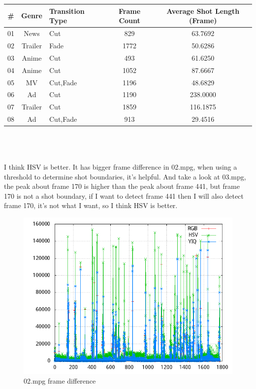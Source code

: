 \documentclass[11pt]{article}
\begin{document}
\section{}

\begin{tabular}{c|c|l|c||c}
	\# & Genre & Transition Type & Frame Count & Average Shot Length (Frame)\\
\hline
\hline
	01 & News & Cut & 829 & 63.7692\\
\hline
	02 & Trailer & Fade & 1772 & 50.6286\\
\hline
	03 & Anime & Cut & 493 & 61.6250\\
\hline
	04 & Anime & Cut & 1052 & 87.6667\\
\hline
	05 & MV & Cut,Fade & 1196 & 48.6829\\
\hline
	06 & Ad & Cut & 1190 & 238.0000\\
\hline
	07 & Trailer & Cut & 1859 & 116.1875\\
\hline
	08 & Ad & Cut,Fade & 913 & 29.4516\\
\end{tabular}
\\
\\
\\
I think HSV is better. It has bigger frame difference in 02.mpg, when using a threshold to determine shot boundaries, it's helpful. And take a look at 03.mpg, the peak about frame 170 is higher than the peak about frame 441, but frame 170 is not a shot boundary, if I want to detect frame 441 then I will also detect frame 170, it's not what I want, so I think HSV is better.
\begin{figure}[ht]
\centering
\includegraphics[scale=0.3]{02diff.png}
\caption{02.mpg frame difference}
\label{}
\end{figure}
\end{document}
